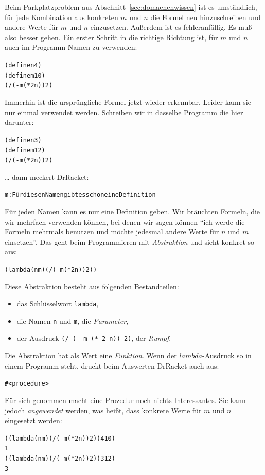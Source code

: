 Beim Parkplatzproblem aus Abschnitt~\ref{sec:domaenenwissen} ist es
umständlich, für jede Kombination aus konkreten $m$ und $n$ die 
Formel neu hinzuschreiben und andere Werte für $m$ und $n$
einzusetzen.  Außerdem ist es fehleranfällig.  Es muß also besser
gehen.  Ein erster Schritt in die richtige Richtung ist, für $m$ und
$n$ auch im Programm Namen zu verwenden:
%
\begin{alltt}
(define n 4)
(define m 10)
(/ (- m (* 2 n)) 2)
\end{alltt}
%
Immerhin ist die ursprüngliche Formel jetzt wieder erkennbar.  Leider
kann sie nur einmal verwendet werden.  Schreiben wir in dasselbe
Programm die hier darunter:
%
\begin{alltt}
(define n 3)
(define m 12)
(/ (- m (* 2 n)) 2)
\end{alltt}
%
\ldots{} dann meckert DrRacket:
%
\begin{alltt}
m: Für diesen Namen gibt es schon eine Definition
\end{alltt}
%
Für jeden Namen kann es nur eine Definition geben.  Wir bräuchten
Formeln, die wir mehrfach verwenden können, bei denen wir sagen können
"`ich werde die Formeln mehrmals benutzen und möchte jedesmal andere
Werte für $n$ und $m$ einsetzen"'. Das geht beim Programmieren mit
\textit{Abstraktion} und sieht konkret so aus:
%
\begin{alltt}
(lambda (n m) (/ (- m (* 2 n)) 2))
\end{alltt}
%
Diese Abstraktion besteht aus folgenden Bestandteilen:
\begin{itemize}
\item das Schlüsselwort \texttt{lambda},
\item die Namen \texttt{n} und \texttt{m}, die \textit{Parameter},
\item der Ausdruck \texttt{(/ (- m (* 2 n)) 2)}, der \textit{Rumpf}.
\end{itemize}
%
Die Abstraktion hat als Wert eine \textit{Funktion}.  Wenn der
$lambda$-Ausdruck so in einem Programm steht, druckt beim Auswerten
DrRacket auch aus:
%
\begin{alltt}
#<procedure>
\end{alltt}
%
Für sich genommen macht eine Prozedur noch nichts Interessantes.  Sie kann jedoch
\emph{angewendet} werden, was heißt, dass konkrete Werte für $m$ und
$n$ eingesetzt werden:
%
\begin{alltt}
((lambda (n m) (/ (- m (* 2 n)) 2)) 4 10)
\evalsto{} 1
((lambda (n m) (/ (- m (* 2 n)) 2)) 3 12)
\evalsto{} 3
\end{alltt}

